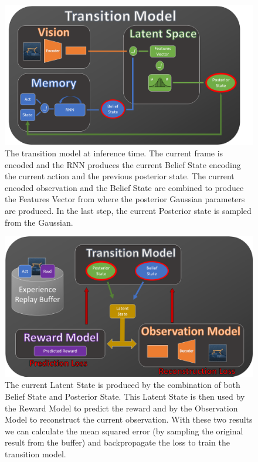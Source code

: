 \begin{figure}[H]
\centering
\includegraphics[width=1.\textwidth, height=.4\textheight]{pictures/planet_schema}
\caption{ The transition model at inference time. The current frame is encoded and the RNN produces the current Belief State encoding the current action and the previous posterior state. The current encoded observation and the Belief State are combined to produce the Features Vector from where the posterior Gaussian parameters are produced. In the last step, the current Posterior state is sampled from the Gaussian.}
\end{figure}

\begin{figure}[H]
\centering
\includegraphics[width=1.\textwidth, height=.4\textheight]{pictures/planet_loss}
\caption{ The current Latent State is produced by the combination of both Belief State and Posterior State. This Latent State is then used by the Reward Model to predict the reward and by the Observation Model to reconstruct the current observation. With these two results we can calculate the mean squared error (by sampling the original result from the buffer) and backpropagate the loss to train the transition model. }
\end{figure}

